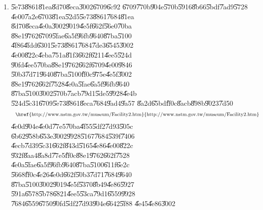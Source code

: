 \documentclass[12pt,a4paper]{article}
\begin{document}
\begin{enumerate}
\item \U{5e73}\U{8861}\U{81ea}\U{8d70}\U{8eca}\U{3002}\U{6709}\U{6c92}%
\U{6709}\U{770b}\U{904e}\U{570b}\U{5916}\U{8b66}\U{5bdf}\U{7ad9}\U{5728}%
\U{4e00}\U{7a2e}\U{6703}\U{81ea}\U{52d5}\U{5e73}\U{8861}\U{7684}\U{81ea}%
\U{8d70}\U{8eca}\U{4e0a}\U{3002}\U{9019}\U{4e5f}\U{662f}\U{56e0}\U{70ba}%
\U{88e1}\U{9762}\U{6709}\U{5fae}\U{6a5f}\U{96fb}\U{9640}\U{87ba}\U{5100}%
\U{4f86}\U{4fdd}\U{6301}\U{5e73}\U{8861}\U{7684}\U{7de3}\U{6545}\U{3002}%
\U{4e00}\U{822c}\U{4eba}\U{751a}\U{81f3}\U{662f}\U{6211}\U{4ee5}\U{524d}%
\U{90fd}\U{4ee5}\U{70ba}\U{88e1}\U{9762}\U{662f}\U{6709}\U{4e00}\U{9846}%
\U{50b3}\U{7d71}\U{9640}\U{87ba}\U{5100}\U{ff0c}\U{975e}\U{4e5f}\U{3002}%
\U{88e1}\U{9762}\U{662f}\U{7528}\U{4e0a}\U{5fae}\U{6a5f}\U{96fb}\U{9640}%
\U{87ba}\U{5100}\U{3002}\U{570b}\U{7acb}\U{79d1}\U{5de5}\U{9928}\U{4e4b}%
\U{524d}\U{5c31}\U{6709}\U{5e73}\U{8861}\U{8eca}\U{7684}\U{9ad4}\U{9a57}%
\U{8a2d}\U{65bd}\U{ff0c}\U{8acb}\U{898b}\U{9023}\U{7d50}%
\begin{equation*}
\text{\href{http://www.nstm.gov.tw/museum/Facility2.htm}{%
http://www.nstm.gov.tw/museum/Facility2.htm}}
\end{equation*}%
\U{4e0d}\U{904e}\U{4e0d}\U{77e5}\U{70ba}\U{4f55}\U{5df2}\U{7d93}\U{505c}%
\U{6b62}\U{958b}\U{653e}\U{3002}\U{9928}\U{5167}\U{7684}\U{539f}\U{7406}%
\U{4ecb}\U{7d39}\U{5c31}\U{662f}\U{843d}\U{5165}\U{4e86}\U{4e00}\U{822c}%
\U{932f}\U{8aa4}\U{8a8d}\U{77e5}\U{ff0c}\U{88e1}\U{9762}\U{662f}\U{7528}%
\U{4e0a}\U{5fae}\U{6a5f}\U{96fb}\U{9640}\U{87ba}\U{5100}\U{611f}\U{6e2c}%
\U{5668}\U{ff0c}\U{4e26}\U{4e0d}\U{662f}\U{50b3}\U{7d71}\U{7684}\U{9640}%
\U{87ba}\U{5100}\U{3002}\U{9019}\U{4e5f}\U{5370}\U{8b49}\U{4e86}\U{5927}%
\U{591a}\U{6578}\U{5b78}\U{6821}\U{4ee5}\U{53ca}\U{79d1}\U{6559}\U{9928}%
\U{7684}\U{6559}\U{6750}\U{90fd}\U{5df2}\U{7d93}\U{904e}\U{6642}\U{5f88}%
\U{4e45}\U{4e86}\U{3002}


\end{enumerate}
\end{document}
